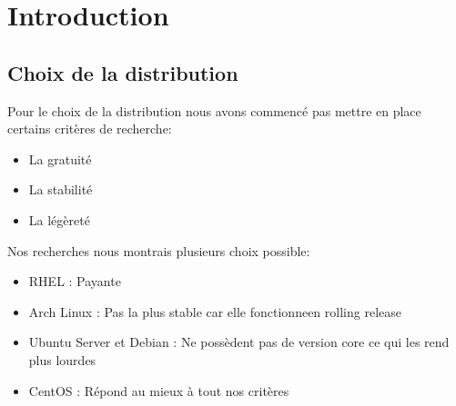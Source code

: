 \section{Introduction}
\subsection{Choix de la distribution}
Pour le choix de la distribution nous avons commencé pas mettre en place certains critères de recherche:
\begin{itemize}
	\item La gratuité
	\item La stabilité
	\item La légèreté
\end{itemize}
Nos recherches nous montrais plusieurs choix possible:
\begin{itemize}
	\item RHEL : Payante
	\item Arch Linux : Pas la plus stable car elle fonctionneen rolling release
	\item Ubuntu Server et Debian : Ne possèdent pas de version core ce qui les rend plus lourdes
	\item CentOS : Répond au mieux à tout nos critères
\end{itemize}


